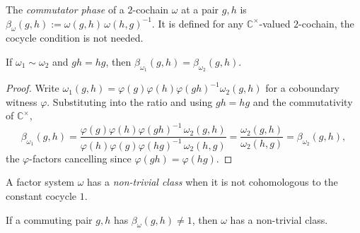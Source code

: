 \begin{definition}\label{def:comm_phase}
    \leanok
    The \emph{commutator phase} of a $2$-cochain $\omega$ at a pair $g,h$ is
    $\beta_\omega(g,h) := \omega(g,h)\,\omega(h,g)^{-1}$.  It is defined for any
    $\mathbb{C}^{\times}$-valued $2$-cochain, the cocycle condition is not needed.
\end{definition}

\begin{theorem}\label{thm:comm_phase_invariant}
    \leanok
    If $\omega_1\sim\omega_2$ and $gh=hg$, then
    $\beta_{\omega_1}(g,h)=\beta_{\omega_2}(g,h)$.
\end{theorem}

\begin{proof}\leanok{}
    Write $\omega_1(g,h)=\varphi(g)\varphi(h)\varphi(gh)^{-1}\omega_2(g,h)$ for a
    coboundary witness $\varphi$.  Substituting into the ratio and using
    $gh=hg$ and the commutativity of $\mathbb{C}^{\times}$,
    \[
        \beta_{\omega_1}(g,h)
        = \frac{\varphi(g)\varphi(h)\varphi(gh)^{-1}\,\omega_2(g,h)}
        {\varphi(h)\varphi(g)\varphi(hg)^{-1}\,\omega_2(h,g)}
        = \frac{\omega_2(g,h)}{\omega_2(h,g)}
        = \beta_{\omega_2}(g,h),
    \]
    the $\varphi$-factors cancelling since $\varphi(gh)=\varphi(hg)$.
\end{proof}

\begin{definition}\label{def:nontrivial_class}
    \leanok
    A factor system $\omega$ has a \emph{non-trivial class} when it is not
    cohomologous to the constant cocycle $1$.
\end{definition}

\begin{theorem}\label{thm:nontrivial_of_comm_phase}
    \leanok
    If a commuting pair $g,h$ has $\beta_\omega(g,h)\neq 1$, then $\omega$ has a
    non-trivial class.
\end{theorem}

